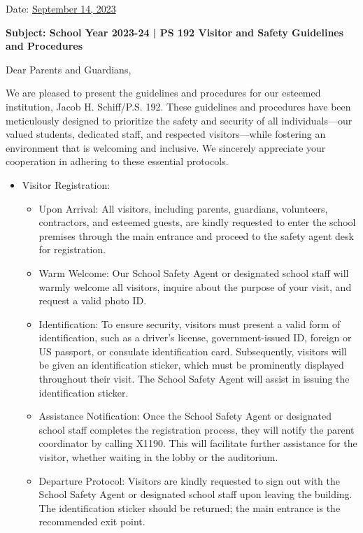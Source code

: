\documentclass[12pt,letterpaper]{article}
\begin{document}
\vspace*{0.5in}
Date: \href{https://www.ps192.org/apps/bbmessages/show_bbm.jsp?REC_ID=139439}{September 14, 2023} 

\textbf{Subject: School Year 2023-24 | PS 192 Visitor and Safety Guidelines and Procedures}

Dear Parents and Guardians,

We are pleased to present the guidelines and procedures for our esteemed institution, Jacob H. Schiff/P.S. 192. These guidelines and procedures have been meticulously designed to prioritize the safety and security of all individuals—our valued students, dedicated staff, and respected visitors—while fostering an environment that is welcoming and inclusive. We sincerely appreciate your cooperation in adhering to these essential protocols.
\begin{itemize}
	\item Visitor Registration:
		\begin{itemize}
		\item Upon Arrival: All visitors, including parents, guardians, 
		volunteers, contractors, and esteemed guests, are kindly requested to
		enter the school premises through the main entrance and proceed to the
		safety agent desk for registration.
		\item Warm Welcome: Our School Safety Agent or designated school staff 
		will warmly welcome all visitors, inquire about the purpose of your
		visit, and request a valid photo ID.
		\item Identification: To ensure security, visitors must present a valid
		form of identification, such as a driver's license, government-issued
		ID, foreign or US passport, or consulate identification card.
		Subsequently, visitors will be given an identification sticker, which
		must be prominently displayed throughout their visit. The School Safety
		Agent will assist in issuing the identification sticker.
		\item Assistance Notification: Once the School Safety Agent or 
		designated school staff completes the registration process, they will
		notify the parent coordinator by calling X1190. This will facilitate
		further assistance for the visitor, whether waiting in the lobby or the
		auditorium.
		\item Departure Protocol: Visitors are kindly requested to sign out with
		the School Safety Agent or designated school staff upon leaving the 
		building. The identification sticker should be returned; the main 
		entrance is the recommended exit point.

\end{itemize}
\end{itemize}
\end{document}
